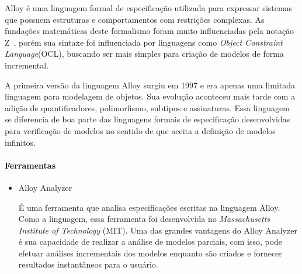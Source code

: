 Alloy é uma linguagem formal de especificação utilizada para expressar sistemas que possuem
estruturas e comportamentos com restrições complexas. As fundações matemáticas deste formalismo
foram muito influenciadas pela notação Z~\cite{opac-b1091336}, porém sua sintaxe foi influenciada
por linguagens como \textit{Object Constraint Language}(OCL), buscando ser mais simples para
criação de modelos de forma incremental.

A primeira versão da linguagem Alloy surgiu em 1997 e era apenas uma limitada linguagem para modelagem
de objetos. Sua evolução aconteceu mais tarde com a adição de quantificadores, polimorfismo, subtipos e
assinaturas. Essa linguagem se diferencia de boa parte das linguagens formais de especificação desenvolvidas
para verificação de modelos no sentido de que aceita a definição de modelos infinitos.

\paragraph{Ferramentas}
\begin{itemize}
\item{Alloy Analyzer}

É uma ferramenta que analisa especificações escritas na linguagem Alloy. Como a linguagem, essa ferramenta
foi desenvolvida no \textit{Massachusetts Institute of Technology} (MIT). Uma das grandes vantagens do Alloy
Analyzer é sua capacidade de realizar a análise de modelos parciais, com isso, pode efetuar análises incrementais
dos modelos enquanto são criados e fornecer resultados instantâneos para o usuário.

\end{itemize}
